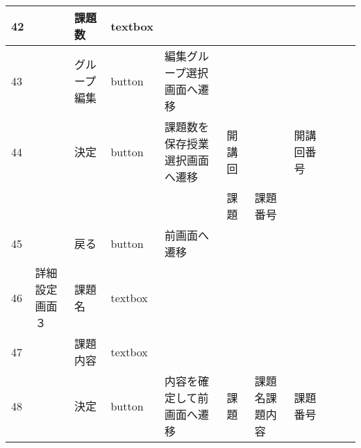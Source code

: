 \begin{table}[]
\begin{tabular}{|l|l|l|l|l|l|l|l|l|l|l|}
42  &               & 課題数              & textbox  &                                                                   &         &                       &                    &                 &                               &                                                                \\ \hline
43  &               & グループ編集           & button   & 編集グループ選択画面へ遷移                                                     &         &                       &                    &                 &                               &                                                                \\ \hline
44  &               & 決定               & button   & 課題数を保存授業選択画面へ遷移                                                   & 開講回     &                       & 開講回番号              &                 &                               &                                                                \\ \hline
    &               &                  &          &                                                                   & 課題      & 課題番号                  &                    &                 &                               &                                                                \\ \hline
45  &               & 戻る               & button   & 前画面へ遷移                                                            &         &                       &                    &                 &                               &                                                                \\ \hline
46  & 詳細設定画面３       & 課題名              & textbox  &                                                                   &         &                       &                    &                 &                               &                                                                \\ \hline
47  &               & 課題内容             & textbox  &                                                                   &         &                       &                    &                 &                               &                                                                \\ \hline
48  &               & 決定               & button   & 内容を確定して前画面へ遷移                                                     & 課題      & 課題名課題内容               & 課題番号               &                 &                               &                                                                \\ \hline

\end{tabular}
\end{table}
